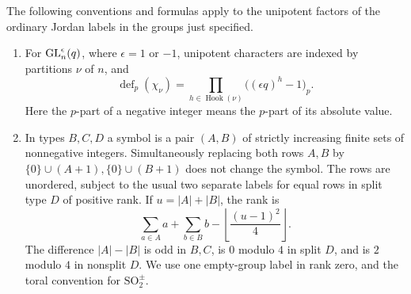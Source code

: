 \begin{proposition}\label{prop:label-degrees}
The following conventions and formulas apply to the unipotent factors
of the ordinary Jordan labels in the groups just specified.
\begin{enumerate}
\item For $\operatorname{GL}_n^\epsilon(q)$, where $\epsilon=1$ or $-1$,
unipotent characters are indexed by partitions $\nu$ of $n$, and
\[
 \operatorname{def}_p(\chi_\nu)
   =\prod_{h\in\operatorname{Hook}(\nu)}
       \bigl((\epsilon q)^h-1\bigr)_p.
\]
Here the $p$-part of a negative integer means the $p$-part of its
absolute value.
\item In types $B,C,D$ a symbol is a pair $(A,B)$ of strictly
increasing finite sets of nonnegative integers.  Simultaneously
replacing both rows $A,B$ by $\{0\}\cup(A+1),\{0\}\cup(B+1)$
does not change the symbol.  The rows are unordered, subject to the
usual two separate labels for equal rows in split type $D$ of positive
rank.  If $u=|A|+|B|$, the rank is
\[
 \sum_{a\in A}a+\sum_{b\in B}b
       -\left\lfloor\frac{(u-1)^2}{4}\right\rfloor.
\]
The difference $|A|-|B|$ is odd in $B,C$, is $0$ modulo $4$ in
split $D$, and is $2$ modulo $4$ in nonsplit $D$.  We use one
empty-group label in rank zero, and the toral convention for
$\mathrm{SO}_2^\pm$.


\end{enumerate}
\end{proposition}
